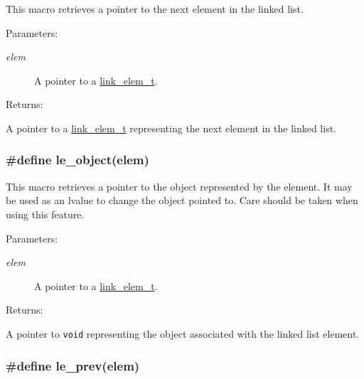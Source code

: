 This macro retrieves a pointer to the next element in the linked list.\begin{Desc}
\item[Parameters: ]\par
\begin{description}
\item[{\em 
elem}]A pointer to a \hyperlink{group__dbprim__link_a1}{link\_\-elem\_\-t}.\end{description}
\end{Desc}
\begin{Desc}
\item[Returns: ]\par
A pointer to a \hyperlink{group__dbprim__link_a1}{link\_\-elem\_\-t} representing the next element in the linked list. \end{Desc}
\hypertarget{group__dbprim__link_a23}{
\subsubsection[le\_\-object]{\setlength{\rightskip}{0pt plus 5cm}\#define le\_\-object(elem)}}
\label{group__dbprim__link_a23}


This macro retrieves a pointer to the object represented by the element. It may be used as an lvalue to change the object pointed to. Care should be taken when using this feature.\begin{Desc}
\item[Parameters: ]\par
\begin{description}
\item[{\em 
elem}]A pointer to a \hyperlink{group__dbprim__link_a1}{link\_\-elem\_\-t}.\end{description}
\end{Desc}
\begin{Desc}
\item[Returns: ]\par
A pointer to {\tt void} representing the object associated with the linked list element. \end{Desc}
\hypertarget{group__dbprim__link_a22}{
\subsubsection[le\_\-prev]{\setlength{\rightskip}{0pt plus 5cm}\#define le\_\-prev(elem)}}
\label{group__dbprim__link_a22}


